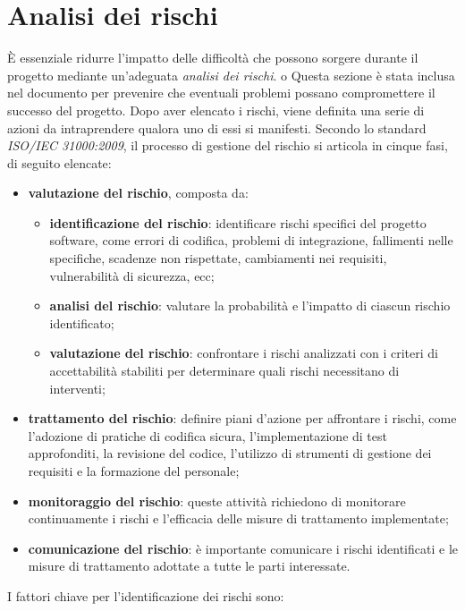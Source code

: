 \section{Analisi dei rischi}
È essenziale ridurre l'impatto delle difficoltà che possono sorgere durante il progetto mediante un'adeguata \textit{analisi dei rischi}. o
Questa sezione è stata inclusa nel documento per prevenire che eventuali problemi possano compromettere il successo del progetto. Dopo aver elencato i rischi, viene definita una serie di azioni da intraprendere qualora uno di essi si manifesti. Secondo lo standard \textit{ISO/IEC 31000:2009}, il processo di gestione del rischio si articola in cinque fasi, di seguito elencate:
\begin{itemize}
	\item \textbf{valutazione del rischio}, composta da:
	      \begin{itemize}
		      \item \textbf{identificazione del rischio}: identificare rischi specifici del progetto software, come errori di codifica, problemi di integrazione, fallimenti nelle specifiche, scadenze non rispettate, cambiamenti nei requisiti, vulnerabilità di sicurezza, ecc;
		      \item \textbf{analisi del rischio}: valutare la probabilità e l'impatto di ciascun rischio identificato;
		      \item \textbf{valutazione del rischio}: confrontare i rischi analizzati con i criteri di accettabilità stabiliti per determinare quali rischi necessitano di interventi;
	      \end{itemize}
	\item \textbf{trattamento del rischio}: definire piani d'azione per affrontare i rischi, come l'adozione di pratiche di codifica sicura, l'implementazione di test approfonditi, la revisione del codice, l'utilizzo di strumenti di gestione dei requisiti e la formazione del personale;
	\item \textbf{monitoraggio del rischio}: queste attività richiedono di monitorare continuamente i rischi e l'efficacia delle misure di trattamento implementate;
	\item \textbf{comunicazione del rischio}: è importante comunicare i rischi identificati e le misure di trattamento adottate a tutte le parti interessate.
\end{itemize}
I fattori chiave per l'identificazione dei rischi sono:
